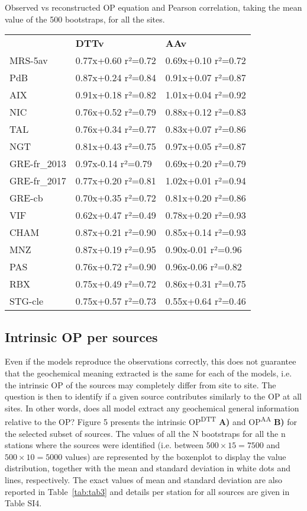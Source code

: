 \documentclass[
]{article}
\begin{document}
Observed vs reconstructed OP equation and Pearson correlation, taking
the mean value of the 500 bootstraps, for all the sites.

\begin{longtable}[]{@{}lll@{}}
\toprule
\endhead
& \textbf{DTTv} & \textbf{AAv}\tabularnewline
MRS-5av & 0.77x+0.60 r²=0.72 & 0.69x+0.10 r²=0.72\tabularnewline
PdB & 0.87x+0.24 r²=0.84 & 0.91x+0.07 r²=0.87\tabularnewline
AIX & 0.91x+0.18 r²=0.82 & 1.01x+0.04 r²=0.92\tabularnewline
NIC & 0.76x+0.52 r²=0.79 & 0.88x+0.12 r²=0.83\tabularnewline
TAL & 0.76x+0.34 r²=0.77 & 0.83x+0.07 r²=0.86\tabularnewline
NGT & 0.81x+0.43 r²=0.75 & 0.97x+0.05 r²=0.87\tabularnewline
GRE-fr\_2013 & 0.97x-0.14 r²=0.79 & 0.69x+0.20 r²=0.79\tabularnewline
GRE-fr\_2017 & 0.77x+0.20 r²=0.81 & 1.02x+0.01 r²=0.94\tabularnewline
GRE-cb & 0.70x+0.35 r²=0.72 & 0.81x+0.20 r²=0.86\tabularnewline
VIF & 0.62x+0.47 r²=0.49 & 0.78x+0.20 r²=0.93\tabularnewline
CHAM & 0.87x+0.21 r²=0.90 & 0.85x+0.14 r²=0.93\tabularnewline
MNZ & 0.87x+0.19 r²=0.95 & 0.90x-0.01 r²=0.96\tabularnewline
PAS & 0.76x+0.72 r²=0.90 & 0.96x-0.06 r²=0.82\tabularnewline
RBX & 0.75x+0.49 r²=0.72 & 0.86x+0.31 r²=0.75\tabularnewline
STG-cle & 0.75x+0.57 r²=0.73 & 0.55x+0.64 r²=0.46\tabularnewline
\bottomrule
\end{longtable}

\hypertarget{intrinsic-op-per-sources}{%
\subsection{Intrinsic OP per sources}\label{intrinsic-op-per-sources}}

Even if the models reproduce the observations correctly, this does not
guarantee that the geochemical meaning extracted is the same for each of
the models, i.e. the intrinsic OP of the sources may completely differ
from site to site. The question is then to identify if a given source
contributes similarly to the OP at all sites. In other words, does all
model extract any geochemical general information relative to the OP?
Figure 5 presents the intrinsic OP\textsuperscript{DTT} \textbf{A)} and
OP\textsuperscript{AA} \textbf{B)} for the selected subset of sources.
The values of all the N bootstraps for all the n stations where the
sources were identified (i.e. between \(500 \times 15 = 7500\) and
\(500 \times 10 = 5000\) values) are represented by the boxenplot to
display the value distribution, together with the mean and standard
deviation in white dots and lines, respectively. The exact values of
mean and standard deviation are also reported in
Table~\protect\hyperlink{tab:tab3}{{[}tab:tab3{]}} and details per
station for all sources are given in Table SI4.
\end{document}
